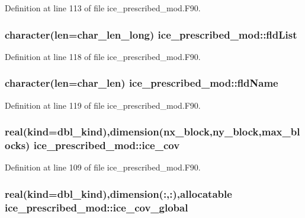 Definition at line 113 of file ice\_\-prescribed\_\-mod.F90.\hypertarget{namespaceice__prescribed__mod_a5bdbd6cc049323f35a5c8f6e4613c369}{
\subsubsection[{fldList}]{\setlength{\rightskip}{0pt plus 5cm}character(len=char\_\-len\_\-long) {\bf ice\_\-prescribed\_\-mod::fldList}}}
\label{namespaceice__prescribed__mod_a5bdbd6cc049323f35a5c8f6e4613c369}


Definition at line 118 of file ice\_\-prescribed\_\-mod.F90.\hypertarget{namespaceice__prescribed__mod_a47d61c09a57e43eefae7895db766851a}{
\subsubsection[{fldName}]{\setlength{\rightskip}{0pt plus 5cm}character(len=char\_\-len) {\bf ice\_\-prescribed\_\-mod::fldName}}}
\label{namespaceice__prescribed__mod_a47d61c09a57e43eefae7895db766851a}


Definition at line 119 of file ice\_\-prescribed\_\-mod.F90.\hypertarget{namespaceice__prescribed__mod_ad870001a33c2597b961fde76bceca0b6}{
\subsubsection[{ice\_\-cov}]{\setlength{\rightskip}{0pt plus 5cm}real(kind=dbl\_\-kind),dimension(nx\_\-block,ny\_\-block,max\_\-blocks) {\bf ice\_\-prescribed\_\-mod::ice\_\-cov}}}
\label{namespaceice__prescribed__mod_ad870001a33c2597b961fde76bceca0b6}


Definition at line 109 of file ice\_\-prescribed\_\-mod.F90.\hypertarget{namespaceice__prescribed__mod_a2bc0b66d04bc6ff5ed1c325ee6292eff}{
\subsubsection[{ice\_\-cov\_\-global}]{\setlength{\rightskip}{0pt plus 5cm}real(kind=dbl\_\-kind),dimension(:,:),allocatable {\bf ice\_\-prescribed\_\-mod::ice\_\-cov\_\-global}}}
\label{namespaceice__prescribed__mod_a2bc0b66d04bc6ff5ed1c325ee6292eff}


